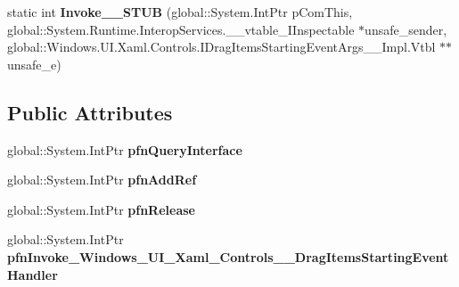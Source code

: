 \begin{DoxyCompactItemize}
\item 
\mbox{\label{struct_windows_1_1_u_i_1_1_xaml_1_1_controls_1_1_drag_items_starting_event_handler_____impl_1_1_vtbl_ac26db477564b8cde386e32339bb31cb8}} 
static int {\bfseries Invoke\+\_\+\+\_\+\+S\+T\+UB} (global\+::\+System.\+Int\+Ptr p\+Com\+This, global\+::\+System.\+Runtime.\+Interop\+Services.\+\_\+\+\_\+vtable\+\_\+\+I\+Inspectable $\ast$unsafe\+\_\+sender, global\+::\+Windows.\+U\+I.\+Xaml.\+Controls.\+I\+Drag\+Items\+Starting\+Event\+Args\+\_\+\+\_\+\+Impl.\+Vtbl $\ast$$\ast$unsafe\+\_\+e)
\end{DoxyCompactItemize}
\subsection*{Public Attributes}
\begin{DoxyCompactItemize}
\item 
\mbox{\label{struct_windows_1_1_u_i_1_1_xaml_1_1_controls_1_1_drag_items_starting_event_handler_____impl_1_1_vtbl_ad958a9fa81b661a5cf9e789102044538}} 
global\+::\+System.\+Int\+Ptr {\bfseries pfn\+Query\+Interface}
\item 
\mbox{\label{struct_windows_1_1_u_i_1_1_xaml_1_1_controls_1_1_drag_items_starting_event_handler_____impl_1_1_vtbl_ae652a192d0355dfdd8cf366396b1d346}} 
global\+::\+System.\+Int\+Ptr {\bfseries pfn\+Add\+Ref}
\item 
\mbox{\label{struct_windows_1_1_u_i_1_1_xaml_1_1_controls_1_1_drag_items_starting_event_handler_____impl_1_1_vtbl_a6bbe025b1a889d07cfe41b94d0809bba}} 
global\+::\+System.\+Int\+Ptr {\bfseries pfn\+Release}
\item 
\mbox{\label{struct_windows_1_1_u_i_1_1_xaml_1_1_controls_1_1_drag_items_starting_event_handler_____impl_1_1_vtbl_afc6c26b79fd0d3ffa88b4c1c61173c1d}} 
global\+::\+System.\+Int\+Ptr {\bfseries pfn\+Invoke\+\_\+\+Windows\+\_\+\+U\+I\+\_\+\+Xaml\+\_\+\+Controls\+\_\+\+\_\+\+Drag\+Items\+Starting\+Event\+Handler}
\end{DoxyCompactItemize}
